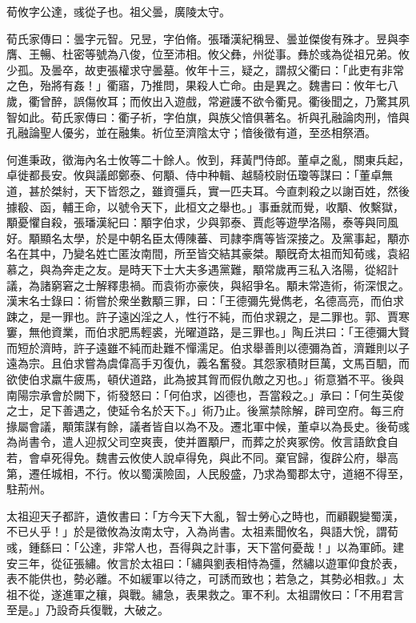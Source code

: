 
\begin{pinyinscope}
荀攸字公達，彧從子也。祖父曇，廣陵太守。

荀氏家傳曰：曇字元智。兄昱，字伯脩。張璠漢紀稱昱、曇並傑俊有殊才。昱與李膺、王暢、杜密等號為八俊，位至沛相。攸父彝，州從事。彝於彧為從祖兄弟。攸少孤。及曇卒，故吏張權求守曇墓。攸年十三，疑之，謂叔父衢曰：「此吏有非常之色，殆將有姦！」衢寤，乃推問，果殺人亡命。由是異之。魏書曰：攸年七八歲，衢曾醉，誤傷攸耳；而攸出入遊戲，常避護不欲令衢見。衢後聞之，乃驚其夙智如此。荀氏家傳曰：衢子祈，字伯旗，與族父愔俱著名。祈與孔融論肉刑，愔與孔融論聖人優劣，並在融集。祈位至濟陰太守；愔後徵有道，至丞相祭酒。

何進秉政，徵海內名士攸等二十餘人。攸到，拜黃門侍郎。董卓之亂，關東兵起，卓徙都長安。攸與議郎鄭泰、何顒、侍中种輯、越騎校尉伍瓊等謀曰：「董卓無道，甚於桀紂，天下皆怨之，雖資彊兵，實一匹夫耳。今直刺殺之以謝百姓，然後據殽、函，輔王命，以號令天下，此桓文之舉也。」事垂就而覺，收顒、攸繫獄，顒憂懼自殺，張璠漢紀曰：顒字伯求，少與郭泰、賈彪等遊學洛陽，泰等與同風好。顒顯名太學，於是中朝名臣太傅陳蕃、司隷李膺等皆深接之。及黨事起，顒亦名在其中，乃變名姓亡匿汝南間，所至皆交結其豪桀。顒旣奇太祖而知荀彧，袁紹慕之，與為奔走之友。是時天下士大夫多遇黨難，顒常歲再三私入洛陽，從紹計議，為諸窮窘之士解釋患禍。而袁術亦豪俠，與紹爭名。顒未常造術，術深恨之。漢末名士錄曰：術嘗於衆坐數顒三罪，曰：「王德彌先覺儁老，名德高亮，而伯求踈之，是一罪也。許子遠凶淫之人，性行不純，而伯求親之，是二罪也。郭、賈寒窶，無他資業，而伯求肥馬輕裘，光曜道路，是三罪也。」陶丘洪曰：「王德彌大賢而短於濟時，許子遠雖不純而赴難不憚濡足。伯求舉善則以德彌為首，濟難則以子遠為宗。且伯求嘗為虞偉高手刃復仇，義名奮發。其怨家積財巨萬，文馬百駟，而欲使伯求羸牛疲馬，頓伏道路，此為披其胷而假仇敵之刃也。」術意猶不平。後與南陽宗承會於闕下，術發怒曰：「何伯求，凶德也，吾當殺之。」承曰：「何生英俊之士，足下善遇之，使延令名於天下。」術乃止。後黨禁除解，辟司空府。每三府掾屬會議，顒策謀有餘，議者皆自以為不及。遷北軍中候，董卓以為長史。後荀彧為尚書令，遣人迎叔父司空爽喪，使并置顒尸，而葬之於爽冢傍。攸言語飲食自若，會卓死得免。魏書云攸使人說卓得免，與此不同。棄官歸，復辟公府，舉高第，遷任城相，不行。攸以蜀漢險固，人民殷盛，乃求為蜀郡太守，道絕不得至，駐荊州。

太祖迎天子都許，遺攸書曰：「方今天下大亂，智士勞心之時也，而顧觀變蜀漢，不已乆乎！」於是徵攸為汝南太守，入為尚書。太祖素聞攸名，與語大恱，謂荀彧，鍾繇曰：「公達，非常人也，吾得與之計事，天下當何憂哉！」以為軍師。建安三年，從征張繡。攸言於太祖曰：「繡與劉表相恃為彊，然繡以遊軍仰食於表，表不能供也，勢必離。不如緩軍以待之，可誘而致也；若急之，其勢必相救。」太祖不從，遂進軍之穰，與戰。繡急，表果救之。軍不利。太祖謂攸曰：「不用君言至是。」乃設奇兵復戰，大破之。


\end{pinyinscope}
